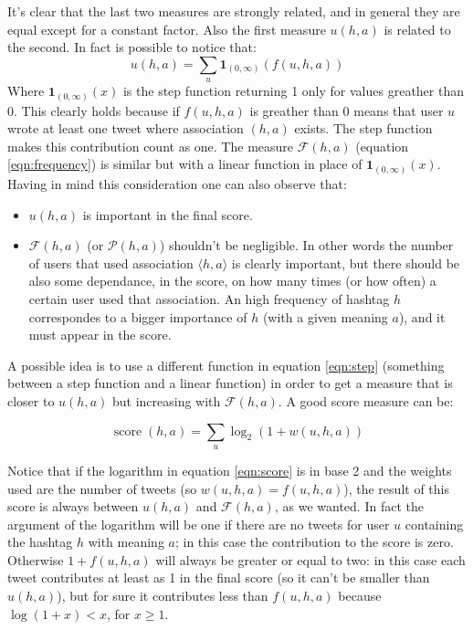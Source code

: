 \documentclass[a4paper,11pt,oneside]{article}
\DeclareMathOperator{\score}{score}
\newcommand{\ha}{$\langle h,a \rangle$\xspace}
\begin{document}
It's clear that the last two measures are strongly related, and in general they are equal except for a constant factor. Also the first measure $u(h,a)$ is related to the second. In fact is possible to notice that:
\begin{equation}
\label{eqn:step}
u(h,a) = \sum_{u} \boldsymbol{1}_{(0,\infty)}\left( f(u,h,a) \right)
\end{equation}
Where $ \boldsymbol{1}_{(0,\infty)}(x) $ is the step function returning 1 only for values greather than 0. This clearly holds because if $ f(u,h,a) $ is greather than 0 means that user $u$ wrote at least one tweet where association $ (h,a) $ exists. The step function makes this contribution count as one.
The measure $\mathcal{F}(h,a)$ (equation \ref{eqn:frequency}) is similar but with a linear function in place of $\boldsymbol{1}_{(0,\infty)}(x)$.
Having in mind this consideration one can also observe that: %

\begin{itemize}
\item $u(h,a)$ is important in the final score.
\item $\mathcal{F}(h,a)$ (or $\mathcal{P}(h,a)$) shouldn't be negligible. In other words the number of users that used association \ha is clearly important, but there should be also some dependance, in the score, on how many times (or how often) a certain user used that association.
An high frequency of hashtag $h$ correspondes to a bigger importance of $h$ (with a given meaning $a$), and it must appear in the score.
\end{itemize}

A possible idea is to use a different function in equation \ref{eqn:step} (something between a step function and a linear function) in order to get a measure that is closer to $ u(h,a) $ but increasing with $ \mathcal{F}(h,a) $. A good score measure can be:

\begin{equation}
\label{eqn:score}
\score (h,a) = \sum_{u} \log _2 \left( 1 + w(u,h,a) \right) 
\end{equation}

Notice that if the logarithm in equation \ref{eqn:score} is in base 2 and the weights used are the number of tweets (so $w(u,h,a) = f(u,h,a)$), the result of this score is always between $u(h,a)$ and $\mathcal{F}(h,a)$, as we wanted.
In fact the argument of the logarithm will be one if there are no tweets for user $u$ containing the hashtag $h$ with meaning $a$; in this case the contribution to the score is zero.
Otherwise $1 + f(u,h,a)$ will always be greater or equal to two: in this case each tweet contributes at least as 1 in the final score (so it can't be smaller than $u(h,a)$), but for sure it contributes less than $f(u,h,a)$ because $\log( 1 + x ) < x$, for $x \geq 1$.
\end{document}
